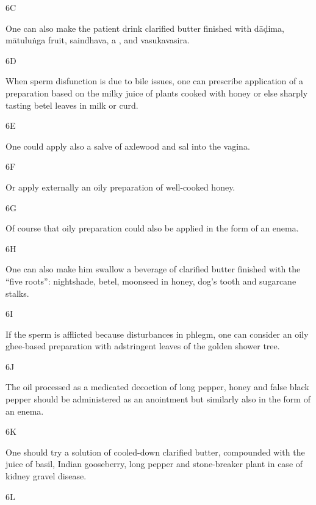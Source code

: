 \begin{translation}
 \item[6C]
 
  One can also make the patient drink clarified butter finished with \gls{dāḍima}, 
  \gls{mātuluṅga} fruit, \gls{saindhava}, a , and 
  \gls{vasukavasira}.
 
 
 \item[6D]
 
   When sperm disfunction is due to bile issues, one can prescribe application of 
   a preparation based on the milky juice of plants cooked with honey or else 
   sharply tasting betel leaves in milk or curd.
 
 \item[6E]
 
  One could apply also a salve of axlewood and sal into the vagina.
 
 \item[6F]
 
  Or apply externally an oily preparation of well-cooked honey.
 
 \item[6G]
 
  Of course that oily preparation could also be applied in the form of an enema.
 
 \item[6H]
 
  One can also make him swallow a beverage of clarified butter finished with the 
  “five roots”: nightshade, betel, moonseed in honey, dog’s tooth and sugarcane 
  stalks. 
 
 \item[6I]
 
  If the sperm is afflicted because disturbances in phlegm, one can consider an 
  oily ghee-based preparation with adstringent leaves of the golden shower tree.
 
 \item[6J]
 
  The oil processed as a medicated decoction of long pepper, honey and false 
  black pepper should be administered as an anointment but similarly also in the 
  form of an enema. 
 
 \item[6K]
 
  One should try a solution of cooled-down clarified butter, compounded with the 
  juice of basil, Indian gooseberry, long pepper and stone-breaker plant in case of 
  kidney gravel disease.
 
 \item[6L]
 

\end{translation}
